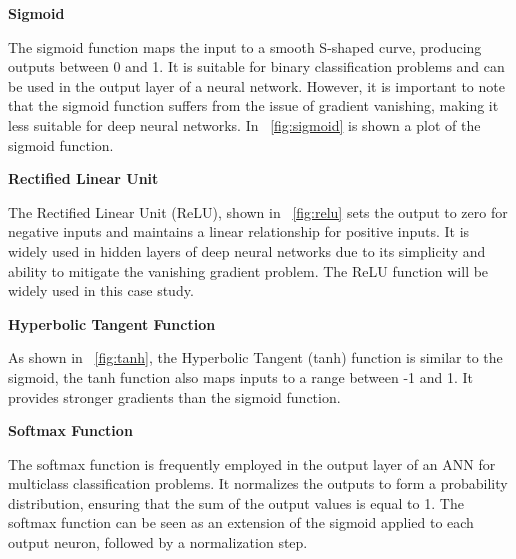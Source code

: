\vspace{0.2cm}
\textbf{Sigmoid}

The sigmoid function maps the input to a smooth S-shaped curve, producing outputs between 0 and 1. It is suitable for binary classification problems and can be used in the output layer of a neural network. However, it is important to note that the sigmoid function suffers from the issue of gradient vanishing, making it less suitable for deep neural networks. In \Fig~\ref{fig:sigmoid} is shown a plot of the sigmoid function.

\vspace{0.2cm}
\textbf{Rectified Linear Unit}

The Rectified Linear Unit (ReLU), shown in \Fig~\ref{fig:relu} sets the output to zero for negative inputs and maintains a linear relationship for positive inputs. It is widely used in hidden layers of deep neural networks due to its simplicity and ability to mitigate the vanishing gradient problem. The ReLU function will be widely used in this case study.

\vspace{0.2cm}
\textbf{Hyperbolic Tangent Function}

As shown in \Fig~\ref{fig:tanh}, the Hyperbolic Tangent (tanh) function is similar to the sigmoid, the tanh function also maps inputs to a range between -1 and 1. It provides stronger gradients than the sigmoid function.

\vspace{0.2cm}
\textbf{Softmax Function}

The softmax function is frequently employed in the output layer of an ANN for multiclass classification problems. It normalizes the outputs to form a probability distribution, ensuring that the sum of the output values is equal to 1. The softmax function can be seen as an extension of the sigmoid applied to each output neuron, followed by a normalization step.

